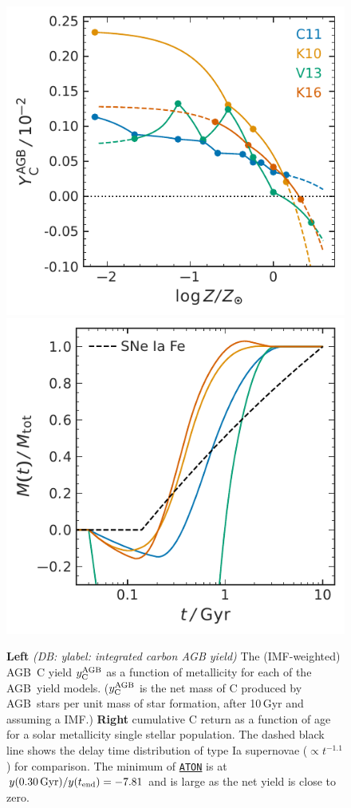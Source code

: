 \documentclass[fleqn,
usenatbib]{mnras}
\newcommand{\aton}{\texttt{\hyperlink{aton}{ATON}}}
\newcommand{\agb}{AGB}
\newcommand{\Ycagb}{{y_{\rm C}^{\rm AGB}}}
\newcommand{\dbnote}[1]{ {\color{Thistle} \textit{\small (DB: #1)}} }
\begin{document}
\begin{figure}
    \centering
    \includegraphics{y_agb_vs_z.pdf}
    \includegraphics{y_agb_vs_t.pdf}

    \caption[]{\textbf{Left} \dbnote{ylabel: integrated carbon AGB yield} The (IMF-weighted) \agb\ C yield $\Ycagb$ as a function of metallicity for each of the \agb\ yield models. ($\Ycagb$ is the net mass of C produced by \agb\ stars per unit mass of star formation, after 10\,Gyr and assuming a \citealt{kroupa01} IMF.)
    \textbf{Right} cumulative C return as a function of age for a solar metallicity single stellar population. The dashed black line shows the delay time distribution of type Ia supernovae ($\propto t^{-1.1}$) for comparison. The minimum of \aton{} is at $y( 0.30\,{\rm Gyr})/y(t_{\rm end})=-7.81$ and is large as the net yield is close to zero.
}

    \label{fig:agb-ssp}

\end{figure}
\end{document}
